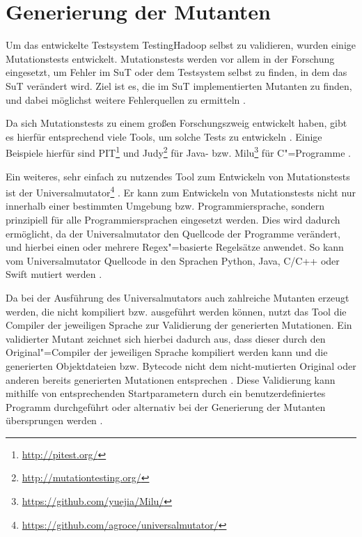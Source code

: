 \section{Generierung der Mutanten}
\label{sec:implMutationTests}

Um das entwickelte Testsystem TestingHadoop selbst zu validieren, wurden einige Mutationstests entwickelt.
Mutationstests werden vor allem in der Forschung eingesetzt, um Fehler im \gls{SuT} oder dem Testsystem selbst zu finden, in dem das \gls{SuT} verändert wird.
Ziel ist es, die im \gls{SuT} implementierten Mutanten zu finden, und dabei möglichst weitere Fehlerquellen zu ermitteln \cite{DeMillo1978,Hamlet1977,Jia2011,Groce2018}.

Da sich Mutationstests zu einem großen Forschungszweig entwickelt haben, gibt es hierfür entsprechend viele Tools, um solche Tests zu entwickeln \cite{Jia2011,Groce2018}.
Einige Beispiele hierfür sind PIT\footnote{\url{http://pitest.org/}} und Judy\footnote{\url{http://mutationtesting.org/}} für Java- bzw. Milu\footnote{\url{https://github.com/yuejia/Milu/}} für C"=Programme \cite{Coles2016,Madeyski2010,Jia2008}.

Ein weiteres, sehr einfach zu nutzendes Tool zum Entwickeln von Mutationstests ist der Universalmutator\footnote{\url{https://github.com/agroce/universalmutator/}} \cite{Groce2018}.
Er kann zum Entwickeln von Mutationstests nicht nur innerhalb einer bestimmten Umgebung bzw. Programmiersprache, sondern prinzipiell für alle Programmiersprachen eingesetzt werden.
Dies wird dadurch ermöglicht, da der Universalmutator den Quellcode der Programme verändert, und hierbei einen oder mehrere \gls{Regex}"=basierte Regelsätze anwendet.
So kann vom Universalmutator Quellcode \uA in den Sprachen Python, Java, C/C++ oder Swift mutiert werden \cite{Groce2018}.

Da bei der Ausführung des Universalmutators auch zahlreiche Mutanten erzeugt werden, die nicht kompiliert bzw. ausgeführt werden können, nutzt das Tool die Compiler der jeweiligen Sprache zur Validierung der generierten Mutationen.
Ein validierter Mutant zeichnet sich hierbei dadurch aus, dass dieser durch den Original"=Compiler der jeweiligen Sprache kompiliert werden kann und die generierten Objektdateien bzw. Bytecode nicht dem nicht-mutierten Original oder anderen bereits generierten Mutationen entsprechen \cite{Groce2018}.
Diese Validierung kann mithilfe von entsprechenden Startparametern durch ein benutzerdefiniertes Programm durchgeführt oder alternativ bei der Generierung der Mutanten übersprungen werden \cite{Groce2018,UniversalmutatorSourceGenmutants}.

